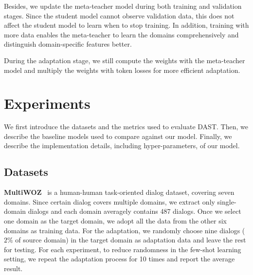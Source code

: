 \documentclass[letterpaper]{article} %
\begin{document}
Besides, we update the meta-teacher model during both training and validation stages. Since the student model cannot observe validation data, this does not affect the student model to learn when to stop training. In addition, training with more data enables the meta-teacher to learn the domains comprehensively and distinguish domain-specific features better.

During the adaptation stage, we still compute the weights with the meta-teacher model and multiply the weights with token losses for more efficient adaptation.







\section*{Experiments}
We first introduce the datasets and the metrics used to evaluate DAST. Then, we describe the baseline models used to compare against our model. Finally, we describe the implementation details, including hyper-parameters, of our model.

\subsection*{Datasets}
\label{multiwoz}
\noindent \textbf{MultiWOZ}~\citep{budzianowski2018multiwoz} is a human-human task-oriented dialog dataset, covering seven domains. Since certain dialog covers multiple domains, we extract only single-domain dialogs and each domain averagely contains 487 dialogs. Once we select one domain as the target domain, we adopt all the data from the other six domains as training data. For the adaptation, we randomly choose nine dialogs ($2\%$ of source domain) in the target domain as adaptation data and leave the rest for testing. For each experiment, to reduce randomness in the few-shot learning setting, we repeat the adaptation process for 10 times and report the average result.
\end{document}
